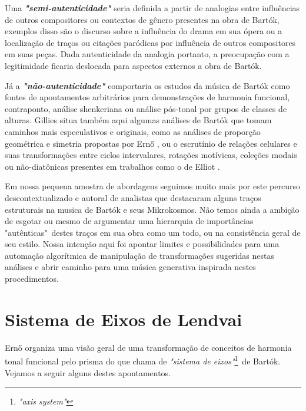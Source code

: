 \documentclass[
	12pt,				%
	openright,			%
	twoside,			%
	a4paper,			%
	english,			%
	french,				%
	spanish,			%
	brazil				%
	]{abntex2}
\begin{document}
Uma \textit{\textbf{"semi-autenticidade"}} seria definida a partir de analogias entre influências de outros compositores ou contextos de gênero presentes na obra de Bartók, exemplos disso são o discurso sobre a influência do drama em sua ópera ou a localização de traços ou citações paródicas por influência de outros compositores em suas peças. Dada autenticidade da analogia portanto, a preocupação com a legitimidade ficaria deslocada para aspectos externos a obra de Bartók.

Já a \textit{\textbf{"não-autenticidade"}} comportaria os estudos da música de Bartók como fontes de apontamentos arbitrários para demonstrações de harmonia funcional, contraponto, análise shenkeriana ou análise pós-tonal por grupos de classes de alturas. Gillies situa também aqui algumas análises de Bartók que tomam caminhos mais especulativos e originais, como as análises de proporção geométrica e simetria propostas por Ern{\H{o}} , ou o escrutínio de relações celulares e suas transformações entre ciclos intervalares, rotações motívicas, coleções modais ou não-diatônicas presentes em trabalhos como o de Elliot . 

Em nossa pequena amostra de abordagens seguimos muito mais por este percurso descontextualizado e autoral de analistas que destacaram alguns traços estruturais na musica de Bartók e seus Mikrokosmos. Não temos ainda a ambição de esgotar ou mesmo de argumentar uma hierarquia de importâncias "autênticas"\ destes traços em sua obra como um todo, ou na consistência geral de seu estilo. Nossa intenção aqui foi apontar limites e possibilidades para uma automação algorítmica de manipulação de transformações sugeridas nestas análises e abrir caminho para uma música generativa inspirada nestes procedimentos.

\section{Sistema de Eixos de Lendvai}
\label{lendvai_eixos}

Ern{\H{o}}  organiza uma visão geral de uma transformação de conceitos de harmonia tonal funcional pelo prisma do que chama de \textit{"sistema de eixos"}\footnote{\textit{"axis system"}\cite[p. 08]{lendvai1971bela}}\ de Bartók. Vejamos a seguir alguns destes apontamentos. 

\end{document}
